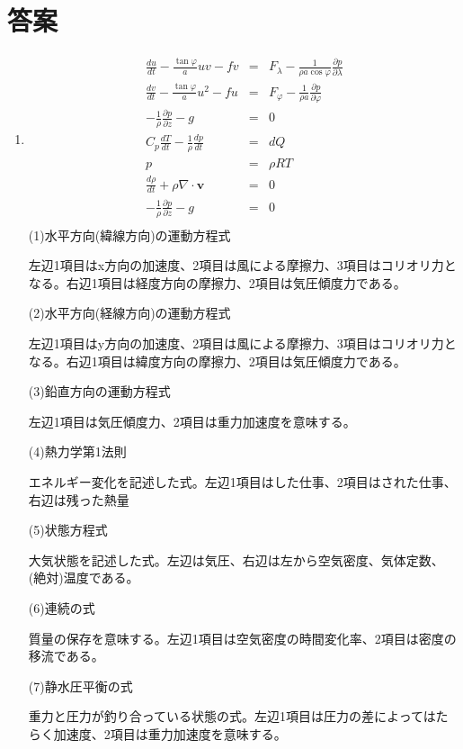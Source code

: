 \documentclass{jsarticle}
\newenvironment{problems}
{
  \renewcommand\labelenumi{\doublebox{\arabic{enumi}}}
  \begin{enumerate}
}{
  \end{enumerate}
  \renewcommand\labelenumi{\arabic{enumi}.}
}
\begin{document}
\section{答案}
\begin{problems}
\item
    \begin{eqnarray}
    \frac{du}{dt}-\frac{\tan\varphi}{a}uv -fv &=& F_{\lambda} - \frac{1}{\rho a \cos\varphi}\frac{\partial p}{\partial \lambda}\\
    \frac{dv}{dt}-\frac{\tan\varphi}{a}u^2 -fu &=& F_{\varphi} - \frac{1}{\rho  a}\frac{\partial p}{\partial \varphi}\\
    -\frac{1}{\rho}\frac{\partial p}{\partial z}-g &=& 0\\
    C_p\frac{dT}{dt}-\frac{1}{\rho}\frac{dp}{dt} &=& dQ\\
    p &=& \rho R T\\
    \frac{d\rho}{dt} + \rho\nabla\cdot \bm{v}&=& 0\\
   -\frac{1}{\rho}\frac{\partial p}{\partial z}-g &=& 0\\
    \end{eqnarray}
(1)水平方向(緯線方向)の運動方程式

左辺1項目はx方向の加速度、2項目は風による摩擦力、3項目はコリオリ力となる。右辺1項目は経度方向の摩擦力、2項目は気圧傾度力である。

(2)水平方向(経線方向)の運動方程式

左辺1項目はy方向の加速度、2項目は風による摩擦力、3項目はコリオリ力となる。右辺1項目は緯度方向の摩擦力、2項目は気圧傾度力である。

(3)鉛直方向の運動方程式

左辺1項目は気圧傾度力、2項目は重力加速度を意味する。

(4)熱力学第1法則

エネルギー変化を記述した式。左辺1項目はした仕事、2項目はされた仕事、右辺は残った熱量

(5)状態方程式

大気状態を記述した式。左辺は気圧、右辺は左から空気密度、気体定数、(絶対)温度である。

(6)連続の式

質量の保存を意味する。左辺1項目は空気密度の時間変化率、2項目は密度の移流である。

(7)静水圧平衡の式

重力と圧力が釣り合っている状態の式。左辺1項目は圧力の差によってはたらく加速度、2項目は重力加速度を意味する。


\end{problems}
\end{document}
